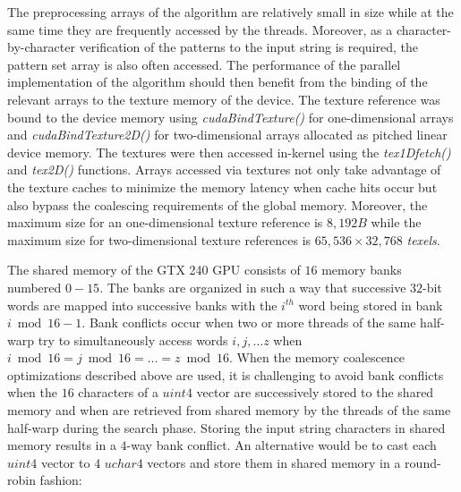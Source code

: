 \documentclass{ws-ijait}
\begin{document}
The preprocessing arrays of the algorithm are relatively small in size while at the same time they are frequently accessed by the threads. Moreover, as a character-by-character verification of the patterns to the input string is required, the pattern set array is also often accessed. The performance of the parallel implementation of the algorithm should then benefit from the binding of the relevant arrays to the texture memory of the device. The texture reference was bound to the device memory using \textit{cudaBindTexture()} for one-dimensional arrays and \textit{cudaBindTexture2D()} for two-dimensional arrays allocated as pitched linear device memory. The textures were then accessed in-kernel using the \textit{tex1Dfetch()} and \textit{tex2D()} functions. Arrays accessed via textures not only take advantage of the texture caches to minimize the memory latency when cache hits occur but also bypass the coalescing requirements of the global memory. Moreover, the maximum size for an one-dimensional texture reference is $8,192B$ while the maximum size for two-dimensional texture references is $65,536 \times 32,768$ \textit{texels}.

\clearpage

The shared memory of the GTX 240 GPU consists of $16$ memory banks numbered $0 - 15$. The banks are organized in such a way that successive $32$-bit words are mapped into successive banks with the $i^{th}$ word being stored in bank $i \bmod 16 - 1$. Bank conflicts occur when two or more threads of the same half-warp try to simultaneously access words $i, j,\ldots z$ when $i \bmod 16 = j \bmod 16 =\ldots = z \bmod 16$. When the memory coalescence optimizations described above are used, it is challenging to avoid bank conflicts when the $16$ characters of a $uint4$ vector are successively stored to the shared memory and when are retrieved from shared memory by the threads of the same half-warp during the search phase. Storing the input string characters in shared memory results in a $4$-way bank conflict. An alternative would be to cast each $uint4$ vector to $4$ $uchar4$ vectors and store them in shared memory in a round-robin fashion:
\end{document}

